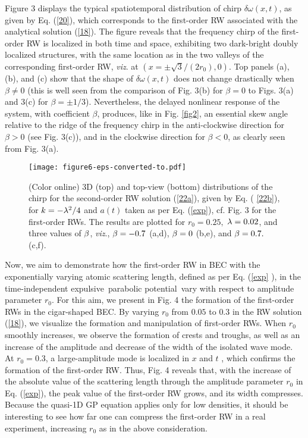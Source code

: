 \documentclass[preprintnumbers]{revtex4}
\begin{document}
Figure 3 displays the typical spatiotemporal distribution of chirp $\delta
\omega (x,t)$, as given by Eq. (\ref{20}), which corresponds to the
first-order RW associated with the analytical solution (\ref{18}). The
figure reveals that the frequency chirp of the first-order RW is localized
in both time and space, exhibiting two dark-bright doubly localized
structures, with the same location as in the two valleys of the
corresponding first-order RW, \textit{viz}. at $\left( x=\pm \sqrt{3}/\left(
2r_{0}\right) ,0\right) $. Top panels (a), (b), and (c) show that the shape
of $\delta \omega (x,t)$ does not change drastically when $\beta \neq 0$
(this is well seen from the comparison of Fig. 3(b) for $\beta =0$ to Figs.
3(a) and 3(c) for $\beta =\pm 1/3$). Nevertheless, the delayed nonlinear
response of the system, with coefficient $\beta $, produces, like in Fig. \ref{fig2},
an essential skew angle relative to the ridge of the frequency chirp in the
anti-clockwise direction for $\beta >0$ (see Fig. 3(c)), and in the
clockwise direction for $\beta <0$, as clearly seen from Fig. 3(a).

\begin{figure}[tbp]
\centerline{\texttt{[image: figure6-eps-converted-to.pdf]}}
\caption{(Color online) 3D (top) and top-view (bottom) distributions of the
chirp for the second-order RW solution (\protect\ref{22a}), given by Eq. (%
\protect\ref{22b}), for $k=-\protect\lambda ^{2}/4$ and $a(t)$ taken as per
Eq. (\protect\ref{exp}), cf. Fig. 3 for the first-order RWs. The results are
plotted for $r_{0}=0.25,$ $\protect\lambda =0.02$, and three values of $%
\protect\beta $, \textit{viz}., $\protect\beta =-0.7$ (a,d), $\protect\beta %
=0$ (b,e), and $\protect\beta =0.7.$(c,f).}
\label{fig7}
\end{figure}

Now, we aim to demonstrate how the first-order RW in BEC with the
exponentially varying atomic scattering length, defined as per Eq. (\ref{exp}%
), in the time-independent expulsive\textit{\ }parabolic potential\ vary
with respect to amplitude parameter $r_{0}$. For this aim, we present in
Fig. 4 the formation of the first-order RWs in the cigar-shaped BEC. By
varying $r_{0}$ from $0.05$ to $0.3$ in the RW solution (\ref{18}), we
visualize the formation and manipulation of first-order RWs. When $r_{0}$
smoothly increases, we observe the formation of crests and troughs, as well
as an increase of the amplitude and decrease of the width of the isolated
wave mode. At $r_{0}=0.3$, a large-amplitude mode is localized in $x$ and $t$%
, which confirms the formation of the first-order RW. Thus, Fig. 4 reveals
that, with the increase of the absolute value of the scattering length
through the amplitude parameter $r_{0}$ in Eq. (\ref{exp}), the peak value
of the first-order RW grows, and its width compresses. Because the quasi-1D
GP equation applies only for low densities, it should be interesting to see
how far one can compress the first-order RW in a real experiment, increasing
$r_{0}$ as in the above consideration.
\end{document}
